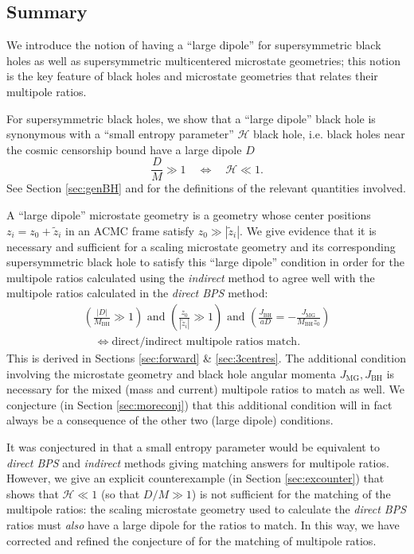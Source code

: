 \documentclass[12pt,a4paper]{article}
\newcommand{\be}{\begin{equation}}
\newcommand{\ee}{\end{equation}}
\def\indirect{\emph{indirect} }
\def\direct{\emph{direct BPS} }
\begin{document}


\subsection{Summary}

We introduce the notion of having a ``large dipole'' for supersymmetric black holes as well as supersymmetric multicentered microstate geometries; this notion is the key feature of black holes and microstate geometries that relates their multipole ratios.

For supersymmetric black holes, we show that a ``large dipole'' black hole is synonymous with a ``small entropy parameter'' $\mathcal{H}$ black hole, i.e. black holes near the cosmic censorship bound have a large dipole $D$
\be \label{eq:DHequiv}
\frac{D}{M} \gg 1 \quad \Leftrightarrow \quad \mathcal{H} \ll 1.\ee
See Section \ref{sec:genBH} and for the definitions of the relevant quantities involved.

A ``large dipole'' microstate geometry is a geometry whose center positions $z_i=z_0+\tilde z_i$ in an ACMC frame satisfy $ z_0\gg |\tilde z_i|$. 
We give evidence that it is necessary and sufficient for a scaling microstate geometry and its corresponding supersymmetric black hole to satisfy this ``large dipole'' condition in order for the multipole ratios calculated using the \indirect method to agree well with the multipole ratios calculated in the \direct method:
\be \begin{aligned} \label{eq:conjTotal} \left(\frac{|D|}{M_\text{BH}}\gg 1\right) \text{ and } \left(\frac{z_0}{|\tilde z_i|}\gg 1\right) \text{ and } \left(\frac{J_\text{BH}}{aD} = -\frac{J_{\text{MG}}}{M_\text{BH}z_0}\right)\\
 \quad \Leftrightarrow \text{direct/indirect multipole ratios match}.
 \end{aligned}\ee
 This is derived in Sections \ref{sec:forward} \& \ref{sec:3centres}.
The additional condition involving the microstate geometry and black hole angular momenta $J_\text{MG},J_\text{BH}$ is necessary for the mixed (mass and current) multipole ratios to match as well. We conjecture (in Section \ref{sec:moreconj}) that this additional condition will in fact always be a consequence of the other two (large dipole) conditions.

It was conjectured in \cite{Bena:2020see,Bena:2020uup} that a small entropy parameter would be equivalent to \direct and \indirect methods giving matching answers for multipole ratios. However, we give an explicit counterexample (in Section \ref{sec:excounter}) that shows that $\mathcal{H}\ll 1$ (so that $D/M\gg1$) is not sufficient for the matching of the multipole ratios: the scaling microstate geometry used to calculate the \direct ratios must \emph{also} have a large dipole for the ratios to match. In this way, we have corrected and refined the conjecture of \cite{Bena:2020see,Bena:2020uup} for the matching of multipole ratios.
\end{document}
